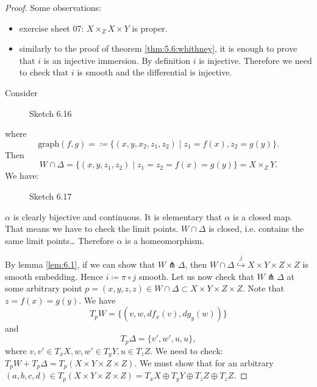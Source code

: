 \begin{proof}
    Some observations:
    \begin{itemize}
        \item exercise sheet 07: \(X\times_ZX\times Y\) is proper.
        \item similarly to the proof of theorem \ref{thm:5.6:whithney}, it is enough to prove that 
              \(i\) is an injective immersion. By definition \(i\) is injective. Therefore we need to check that \(i\) is smooth and the differential is injective.
    \end{itemize}

    Consider 
    \begin{figure}[H]\label{fig:6.16}
        \centering
        \caption{Sketch 6.16}
    \end{figure}        
    where \[\text{graph}(f,g)=\coloneqq \{(x,y,x_2,z_1,z_2)\mid z_1=f(x),z_2=g(y)\}.\]
    Then \[W\cap \Delta=\{(x,y,z_1,z_2)\mid z_1=z_2=f(x)=g(y)\}=X\times_ZY.\]
    We have:
    \begin{figure}[H]\label{fig:6.17}
        \centering
        \caption{Sketch 6.17}
    \end{figure} 
    \(\alpha\) is clearly bijective and continuous. It is elementary that \(\alpha\) is a closed map.
    That means we have to check the limit points. \(W\cap \Delta\) is closed, i.e. contains the same limit points\dots   
    Therefore \(\alpha\) is a homeomorphism.

    By lemma \ref{lem:6.1}, if we can show that \(W\pitchfork \Delta\), then \(W\cap \Delta\stackrel{j}{\hookrightarrow}X\times Y\times Z\times Z\) is smooth embedding. 
    Hence \(i\coloneqq \pi\circ j\) smooth. Let us now check that \(W\pitchfork \Delta\) at some arbitrary point \(p=(x,y,z,z)\in W\cap \Delta\subset X\times Y\times Z\times Z\).
    Note that \(z=f(x)=g(y)\). We have \[T_pW=\{(v,w,df_x(v),dg_y(w))\}\]
    and 
    \[T_p\Delta=\{v',w',u,u\},\]
    where \(v,v'\in T_xX,w,w'\in T_yY,u\in T_zZ.\)
    We need to check: \(T_p W+T_p\Delta=T_p(X\times Y\times Z\times Z)\). 
    We must show that for an arbitrary \((a,b,c,d)\in T_p(X\times Y\times Z\times Z)=T_xX\oplus T_yY\oplus T_zZ \oplus T_zZ.\)


\end{proof}
